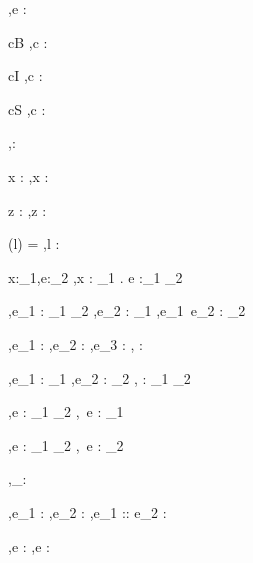 




  {\Gamma,\Sigma \infers e : \tau}


  {c\in B}
  {\Gamma,\Sigma \infers c : \Bool}

  {c\in I}
  {\Gamma,\Sigma \infers c : \Int}

  {c\in S}
  {\Gamma,\Sigma \infers c : \String}


  { }
  {\Gamma,\Sigma \infers \unit : \Unit}


  {x : \tau \in \Gamma}
  {\Gamma,\Sigma \infers x : \tau}

  {z : \beta \in \Gamma}
  {\Gamma,\Sigma \infers z : \beta}

  {\Sigma(l) = \beta}
  {\Gamma,\Sigma \infers l : \Reference \beta}


  {\Gamma \cdot x:\tau_1,\Sigma \infers e:\tau_2}
  {\Gamma,\Sigma \infers \lambda x : \tau_1 . e :\tau_1 \to \tau_2}

  {\Gamma,\Sigma \infers e_1 : \tau_1 \to \tau_2 \Quad
   \Gamma,\Sigma \infers e_2 : \tau_1}
  {\Gamma,\Sigma \infers e_1\ e_2 : \tau_2}


  {\Gamma,\Sigma \infers e_1 : \Bool \Quad
   \Gamma,\Sigma \infers e_2 : \tau \Quad
   \Gamma,\Sigma \infers e_3 : \tau}
  {\Gamma,\Sigma \infers {} : \tau}


    {\Gamma,\Sigma \infers e_1 : \tau_1  \Quad
     \Gamma,\Sigma \infers e_2 : \tau_2}
    {\Gamma,\Sigma \infers {} : \tau_1 \times \tau_2}

  {\Gamma,\Sigma \infers e : \tau_1 \times \tau_2}
  {\Gamma,\Sigma \infers \Fst\ e : \tau_1}

    {\Gamma,\Sigma \infers e : \tau_1 \times \tau_2}
    {\Gamma,\Sigma \infers \Snd\ e : \tau_2}


  { }
  {\Gamma,\Sigma \infers [\ ]_\tau : \List \tau}

  {\Gamma,\Sigma \infers e_1 : \tau \Quad
   \Gamma,\Sigma \infers e_2 : \List \tau}
  {\Gamma,\Sigma \infers e_1 :: e_2 : \List \tau}

  {\Gamma,\Sigma \infers e : \List\tau}
  {\Gamma,\Sigma \infers \Head e : \tau}

